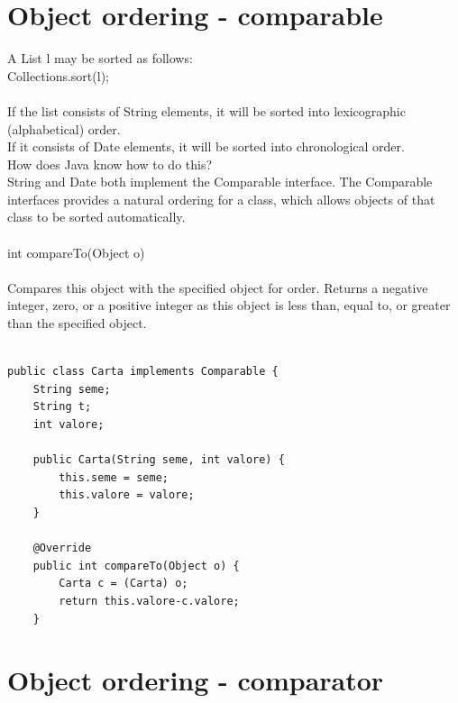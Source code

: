 \documentclass[10pt,a4paper]{book}
\begin{document}
\newpage
\section{Object ordering - comparable}
A List l may be sorted as follows: \\
Collections.sort(l); \\\\
If the list consists of String elements, it will be sorted into lexicographic (alphabetical) order. \\
If it consists of Date elements, it will be sorted into chronological order. \\
How does Java know how to do this? \\
String and Date both implement the Comparable interface. The Comparable interfaces provides a natural ordering for a class, which allows objects of that class to be sorted automatically. \\\\
int compareTo(Object o) \\\\
Compares this object with the specified object for order. Returns a negative integer, zero, or a positive integer as this object is less than, equal to, or greater than the specified object. 
\\\\
\begin{verbatim}
public class Carta implements Comparable { 
    String seme;
    String t;
    int valore;
    
    public Carta(String seme, int valore) {
        this.seme = seme;
        this.valore = valore;
    }
    
    @Override
    public int compareTo(Object o) {
        Carta c = (Carta) o;
        return this.valore-c.valore;
    }

\end{verbatim}

\newpage
\section{Object ordering - comparator}
\end{document}
